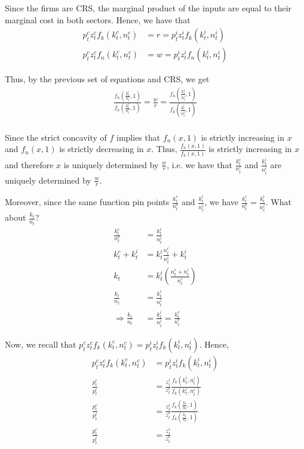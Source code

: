 \documentclass[12pt]{article}
\newcommand{\1}{{\bf 1}} %
\begin{document}
	Since the firms are CRS, the marginal product of the inputs are equal to their marginal cost in both sectors. Hence, we have that
	\begin{align*}
		p_t^cz_t^cf_k(k_t^c,n_t^c)&=r=p_t^iz_t^if_k(k_t^i,n_t^i)\\
		p_t^cz_t^cf_n(k_t^c,n_t^c)&=w=p_t^iz_t^if_n(k_t^i,n_t^i)
	\end{align*}
	
	Thus, by the previous set of equations and CRS, we get
	\begin{align*}
		\frac{f_n\left( \frac{k_t^c}{n_t^c},1\right) }{f_k\left( \frac{k_t^c}{n_t^c},1\right)} = \frac{w}{r} = \frac{f_n\left( \frac{k_t^i}{n_t^i},1\right)}{f_k\left( \frac{k_t^i}{n_t^i},1\right)} \\
	\end{align*}

Since the strict concavity of $f$ implies that $f_n\left( x,1\right)$ is strictly increasing in $x$ and $f_n\left( x,1\right)$ is strictly decreasing in $x$. Thus, $\frac{f_n\left( x,1\right) }{f_k\left( x,1\right)}$ is strictly increasing in $x$ and therefore $x$ is uniquely determined by $\frac{w}{r}$, i.e. we have that $\frac{k_t^c}{n_t^c}$ and $\frac{k_t^i}{n_t^i}$ are uniquely determined by $\frac{w}{r}$. 

Moreover, since the same function pin points $\frac{k_t^c}{n_t^c}$ and $\frac{k_t^i}{n_t^i}$, we have $\frac{k_t^c}{n_t^c}=\frac{k_t^i}{n_t^i}$. What about $\frac{k_t}{n_t}$?
\begin{align*}
	 \frac{k_t^c}{n_t^c}& =\frac{k_t^i}{n_t^i}\\
	 k_t^c+k_t^i& =k_t^i\frac{n_t^c}{n_t^i}+k_t^i\\
	 k_t& =k_t^i\left( \frac{n_t^c+n_t^i}{n_t^i}\right) \\
	 \frac{k_t}{n_t}& = \frac{k_t^i}{n_t^i} \\
	 \Rightarrow  \frac{k_t}{n_t}& = \frac{k_t^i}{n_t^i} = \frac{k_t^c}{n_t^c}
\end{align*}

Now, we recall that $p_t^cz_t^cf_k(k_t^c,n_t^c)=p_t^iz_t^if_k(k_t^i,n_t^i)$. Hence,
\begin{align*}
p_t^cz_t^cf_k(k_t^c,n_t^c) &=p_t^iz_t^if_k(k_t^i,n_t^i)\\
\frac{p_t^c}{p_t^i}&=\frac{z_t^i}{z_t^c}\frac{f_k(k_t^i,n_t^i)}{f_k(k_t^c,n_t^c)}\\
\frac{p_t^c}{p_t^i}&=\frac{z_t^i}{z_t^c}\frac{f_k\left( \frac{k_t}{n_t},1\right) }{f_k\left( \frac{k_t}{n_t},1\right)}\\
\frac{p_t^c}{p_t^i}&=\frac{z_t^i}{z_t^c}
\end{align*}
\end{document}
